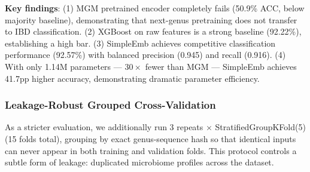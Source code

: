 \documentclass{article} %
\begin{document}
\textbf{Key findings}: (1) MGM pretrained encoder completely fails (50.9\% ACC, below majority baseline), demonstrating that next-genus pretraining does not transfer to IBD classification. (2) XGBoost on raw features is a strong baseline (92.22\%), establishing a high bar. (3) SimpleEmb achieves competitive classification performance (92.57\%) with balanced precision (0.945) and recall (0.916). (4) With only 1.14M parameters --- $30\times$ fewer than MGM --- SimpleEmb achieves 41.7pp higher accuracy, demonstrating dramatic parameter efficiency.

\subsubsection{Leakage-Robust Grouped Cross-Validation}

As a stricter evaluation, we additionally run 3 repeats $\times$ StratifiedGroupKFold(5) (15 folds total), grouping by exact genus-sequence hash so that identical inputs can never appear in both training and validation folds. This protocol controls a subtle form of leakage: duplicated microbiome profiles across the dataset.
\end{document}
